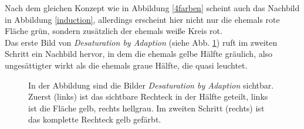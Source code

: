 \documentclass[11pt]{article}
\begin{document}
Nach dem gleichen Konzept wie in Abbildung \ref{4farben} scheint auch das Nachbild in Abbildung \ref{induction}, allerdings erscheint hier nicht nur die ehemals rote Fläche grün, sondern zusätzlich der ehemals weiße Kreis rot.\\

Das erste Bild von \textit{Desaturation by Adaption} (siehe Abb. \ref{desat}) ruft im zweiten Schritt ein Nachbild hervor, in dem die ehemals gelbe Hälfte gräulich, also ungesättigter wirkt als die ehemals graue Hälfte, die quasi leuchtet. 

\begin{figure}[H]
\caption{In der Abbildung sind die Bilder \textit{Desaturation by Adaption} sichtbar. Zuerst (links) ist das sichtbare Rechteck in der Hälfte geteilt, links ist die Fläche gelb, rechts hellgrau. Im zweiten Schritt (rechts) ist das komplette Rechteck gelb gefärbt.}
\label{desat}
\end{figure}
\end{document}
